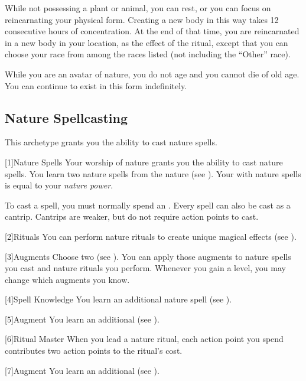         While not possessing a plant or animal, you can rest, or you can focus on reincarnating your physical form.
        Creating a new body in this way takes 12 consecutive hours of concentration.
        At the end of that time, you are reincarnated in a new body in your location, as the effect of the  ritual, except that you can choose your race from among the races listed (not including the ``Other'' race).

        While you are an avatar of nature, you do not age and you cannot die of old age.
        You can continue to exist in this form indefinitely.

    \subsection{Nature Spellcasting}
        This archetype grants you the ability to cast nature spells.

        [1]{Nature Spells}
        Your worship of nature grants you the ability to cast nature spells.
        You learn two nature spells from the nature  (see ).
        Your  with nature spells is equal to your \textit{nature power}.

        To cast a spell, you must normally spend an .
        Every spell can also be cast as a cantrip.
        Cantrips are weaker, but do not require action points to cast.

        [2]{Rituals}
        You can perform nature rituals to create unique magical effects (see ).

        [3]{Augments}
        Choose two  (see ).
        You can apply those augments to nature spells you cast and nature rituals you perform.
        Whenever you gain a level, you may change which augments you know.

        [4]{Spell Knowledge}
        You learn an additional nature spell (see ).

        [5]{Augment}
        You learn an additional  (see ).

        [6]{Ritual Master}
        When you lead a nature ritual, each action point you spend contributes two action points to the ritual's cost.

        [7]{Augment}
        You learn an additional  (see ).

